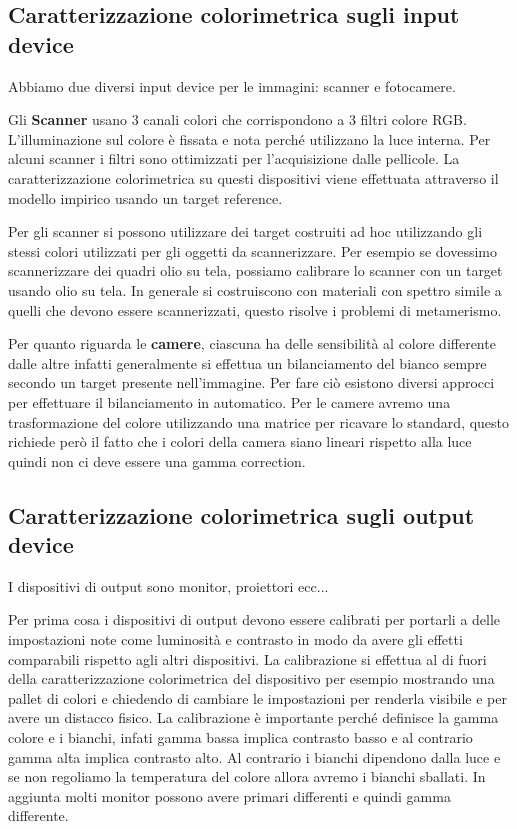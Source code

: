 \subsection{Caratterizzazione colorimetrica sugli input device}
Abbiamo due diversi input device per le immagini: scanner e fotocamere.

Gli \textbf{Scanner} usano $3$ canali colori che corrispondono a 3 filtri colore RGB.
L'illuminazione sul colore è fissata e nota perché utilizzano la luce interna. 
Per alcuni scanner i filtri sono ottimizzati per l'acquisizione dalle pellicole. 
La caratterizzazione colorimetrica su questi dispositivi viene effettuata attraverso 
il modello impirico usando un target reference. 

Per gli scanner si possono utilizzare dei target costruiti ad hoc utilizzando gli  
stessi colori utilizzati per gli oggetti da scannerizzare. Per esempio se dovessimo 
scannerizzare dei quadri olio su tela, possiamo calibrare lo scanner con un target 
usando olio su tela. In generale si costruiscono con materiali con spettro simile 
a quelli che devono essere scannerizzati, questo risolve i problemi di metamerismo.

Per quanto riguarda le \textbf{camere}, ciascuna ha delle sensibilità al colore 
differente dalle altre infatti generalmente si effettua un bilanciamento del bianco
sempre secondo un target presente nell'immagine. Per fare ciò esistono diversi 
approcci per effettuare il bilanciamento in automatico. Per le camere avremo una 
trasformazione del colore utilizzando una matrice per ricavare lo standard, questo 
richiede però il fatto che i colori della camera siano lineari rispetto alla luce 
quindi non ci deve essere una gamma correction.

\subsection{Caratterizzazione colorimetrica sugli output device}
I dispositivi di output sono monitor, proiettori ecc...

Per prima cosa i dispositivi di output devono essere calibrati per portarli a
delle impostazioni note come luminosità e contrasto in modo da avere gli effetti 
comparabili rispetto agli altri dispositivi. La calibrazione si effettua al di fuori 
della caratterizzazione colorimetrica del dispositivo per esempio mostrando una 
pallet di colori e chiedendo di cambiare le impostazioni per renderla visibile e 
per avere un distacco fisico. La calibrazione è importante perché definisce la 
gamma colore e i bianchi, infati gamma bassa implica contrasto basso e al contrario 
gamma alta implica contrasto alto. Al contrario i bianchi dipendono dalla luce e 
se non regoliamo la temperatura del colore allora avremo i bianchi sballati. In aggiunta 
molti monitor possono avere primari differenti e quindi gamma differente.

